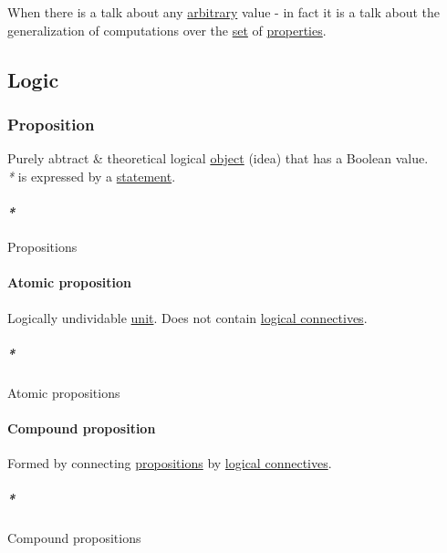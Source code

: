 \documentclass[11pt]{article}
\begin{document}
When there is a talk about any \hyperref[orga23d095]{arbitrary} value - in fact it is a talk about the generalization of computations over the \hyperref[org1faf06d]{set} of \hyperref[org85fb3a1]{properties}.\\

\subsection{Logic}
\label{sec:org240f43e}
\subsubsection{\label{org1e068ed}Proposition}
\label{sec:org04618a1}
Purely abtract \& theoretical logical \hyperref[org4be0e9d]{object} (idea) that has a Boolean value.\\

\emph{*} is expressed by a \hyperref[org36313c0]{statement}.\\

\paragraph{\emph{*}}
\label{sec:org67c4090}

\label{org6498988}Propositions\\

\paragraph{\label{orge982a51}Atomic proposition}
\label{sec:orga5a7a06}
Logically undividable \hyperref[org0b3ee46]{unit}. Does not contain \hyperref[orgc2786fc]{logical connectives}.\\

\subparagraph{\emph{*}}
\label{sec:orgb009e86}

\label{org7521680}Atomic propositions\\

\paragraph{\label{orgcee1e50}Compound proposition}
\label{sec:org1975a35}
Formed by connecting \hyperref[org6498988]{propositions} by \hyperref[orgc2786fc]{logical connectives}.\\

\subparagraph{\emph{*}}
\label{sec:org87c02b4}

\label{orge244ac9}Compound propositions\\
\end{document}
